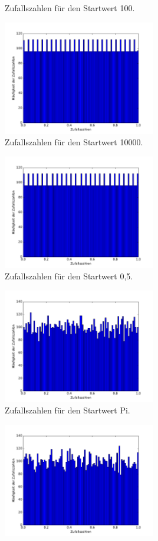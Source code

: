 \documentclass[
  bibliography=totoc,     %
  captions=tableheading,  %
  titlepage=firstiscover, %
]{scrartcl}
\begin{document}
\begin{figure}[H]
\begin{subfigure}{0.48\textwidth}
        \caption{Zufallszahlen für den Startwert 100.}
      \end{subfigure}
      \begin{subfigure}{0.48\textwidth}
        \centering
        \includegraphics[height=5cm]{Histogrammb6.pdf}
        \caption{Zufallszahlen für den Startwert 10000.}
      \end{subfigure}
      \centering
      \begin{subfigure}{0.48\textwidth}
        \centering
        \includegraphics[height=5cm]{Histogrammb7.pdf}
        \caption{Zufallszahlen für den Startwert 0,5.}
      \end{subfigure}
      \begin{subfigure}{0.48\textwidth}
        \centering
        \includegraphics[height=5cm]{Histogrammb8.pdf}
        \caption{Zufallszahlen für den Startwert Pi.}
      \end{subfigure}
      \begin{subfigure}{0.48\textwidth}
        \centering
        \includegraphics[height=5cm]{Histogrammb9.pdf}

\end{subfigure}
\end{figure}
\end{document}
